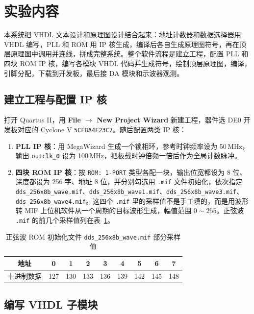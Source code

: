 \documentclass[12pt]{ctexart}
\begin{document}
\section{实验内容}

本系统把 VHDL 文本设计和原理图设计结合起来：地址计数器和数据选择器用 VHDL 编写，PLL 和 ROM 用 IP 核生成，编译后各自生成原理图符号，再在顶层原理图中调用并连线，拼成完整系统。整个软件流程是建立工程，配置 PLL 和四块 ROM IP 核，编写各模块 VHDL 代码并生成符号，绘制顶层原理图，编译，引脚分配，下载到开发板，最后接 DA 模块和示波器观测。

\subsection{建立工程与配置 IP 核}

打开 Quartus II，用 \textbf{File $\rightarrow$ New Project Wizard} 新建工程，器件选 DE0 开发板对应的 Cyclone V \texttt{5CEBA4F23C7}。随后配置两类 IP 核：

\begin{enumerate}
    \item \textbf{PLL IP 核}：用 MegaWizard 生成一个锁相环，参考时钟频率设为 50\,MHz，输出 \texttt{outclk\_0} 设为 100\,MHz，把板载时钟倍频一倍后作为全局计数脉冲。
    \item \textbf{四块 ROM IP 核}：按 \texttt{ROM: 1-PORT} 类型各配一块，输出位宽都设为 8 位、深度都设为 256 字、地址 8 位，并分别勾选用 \texttt{.mif} 文件初始化，依次指定 \texttt{dds\_256x8b\_wave.mif}、\texttt{dds\_256x8b\_wave1.mif}、\texttt{dds\_256x8b\_wave3.mif}、\texttt{dds\_256x8b\_wave4.mif}。这四个 \texttt{.mif} 里的采样值不是手工填的，而是用波形转 MIF 上位机软件从一个周期的目标波形生成，幅值范围 $0\sim255$。正弦波 \texttt{.mif} 的前几个采样值列在表~\ref{tab:sinmif}。
\end{enumerate}

\begin{table}[H]
    \centering
    \caption{正弦波 ROM 初始化文件 \texttt{dds\_256x8b\_wave.mif} 部分采样值}
    \label{tab:sinmif}
    \begin{tabular}{ccccccccc}
        \toprule
        地址 & 0 & 1 & 2 & 3 & 4 & 5 & 6 & 7 \\
        \midrule
        十进制数据 & 127 & 130 & 133 & 136 & 139 & 142 & 145 & 148 \\
        \bottomrule
    \end{tabular}
\end{table}

\subsection{编写 VHDL 子模块}
\end{document}
